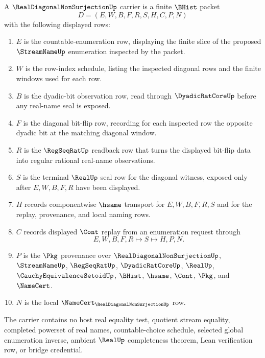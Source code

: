 \begin{definition}
\label{def:real-diagonal-non-surjection-carrier}
A $\RealDiagonalNonSurjectionUp$ carrier is a finite $\BHist$ packet
$$
D=(E,W,B,F,R,S,H,C,P,N)
$$
with the following displayed rows:
\begin{enumerate}
\item $E$ is the countable-enumeration row, displaying the finite slice of the proposed $\StreamNameUp$ enumeration inspected by the packet.
\item $W$ is the row-index schedule, listing the inspected diagonal rows and the finite windows used for each row.
\item $B$ is the dyadic-bit observation row, read through $\DyadicRatCoreUp$ before any real-name seal is exposed.
\item $F$ is the diagonal bit-flip row, recording for each inspected row the opposite dyadic bit at the matching diagonal window.
\item $R$ is the $\RegSeqRatUp$ readback row that turns the displayed bit-flip data into regular rational real-name observations.
\item $S$ is the terminal $\RealUp$ seal row for the diagonal witness, exposed only after $E,W,B,F,R$ have been displayed.
\item $H$ records componentwise $\hsame$ transport for $E,W,B,F,R,S$ and for the replay, provenance, and local naming rows.
\item $C$ records displayed $\Cont$ replay from an enumeration request through
$$
E,W,B,F,R \longmapsto S \longmapsto H,P,N .
$$
\item $P$ is the $\Pkg$ provenance over $\RealDiagonalNonSurjectionUp$, $\StreamNameUp$, $\RegSeqRatUp$, $\DyadicRatCoreUp$, $\RealUp$, $\CauchyEquivalenceSetoidUp$, $\BHist$, $\hsame$, $\Cont$, $\Pkg$, and $\NameCert$.
\item $N$ is the local $\NameCert_{\RealDiagonalNonSurjectionUp}$ row.
\end{enumerate}
The carrier contains no host real equality test, quotient stream equality, completed powerset of real names, countable-choice schedule, selected global enumeration inverse, ambient $\RealUp$ completeness theorem, Lean verification row, or bridge credential.
\end{definition}

